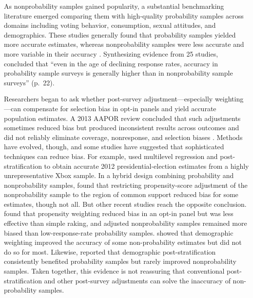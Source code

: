 \documentclass[12pt]{article}
\begin{document}
As nonprobability samples gained popularity, a substantial benchmarking literature emerged comparing them with high-quality probability samples across domains including voting behavior, consumption, sexual attitudes, and demographics. These studies generally found that probability samples yielded more accurate estimates, whereas nonprobability samples were less accurate and more variable in their accuracy \parencite[e.g.,][]{chang_national_2009, dutwin_apples_2017, erens_nonprobability_2014, macinnis_accuracy_2018, sturgis_assessment_2018, szolnoki_online_2013, yeager_comparing_2011}. Synthesizing evidence from 25 studies, \textcite{cornesse_review_2020} concluded that ``even in the age of declining response rates, accuracy in probability sample surveys is generally higher than in nonprobability sample surveys'' (p.~22).

Researchers began to ask whether post-survey adjustment—especially weighting—can compensate for selection bias in opt-in panels and yield accurate population estimates. A 2013 AAPOR review concluded that such adjustments sometimes reduced bias but produced inconsistent results across outcomes and did not reliably eliminate coverage, nonresponse, and selection biases \parencite{baker_report_2013}. Methods have evolved, though, and some studies have suggested that sophisticated techniques can reduce bias. For example, \textcite{wang_forecasting_2015} used multilevel regression and post-stratification to obtain accurate 2012 presidential-election estimates from a highly unrepresentative Xbox sample. In a hybrid design combining probability and nonprobability samples, \textcite{dever_combining_2018} found that restricting propensity-score adjustment of the nonprobability sample to the region of common support reduced bias for some estimates, though not all. But other recent studies reach the opposite conclusion. \textcite{dutwin_apples_2017} found that propensity weighting reduced bias in an opt-in panel but was less effective than simple raking, and adjusted nonprobability samples remained more biased than low-response-rate probability samples. \textcite{yeager_comparing_2011} showed that  demographic weighting improved the accuracy of some non-probability estimates but did not do so for most. Likewise, \textcite{macinnis_accuracy_2018} reported that demographic post-stratification consistently benefited probability samples but rarely improved nonprobability samples. Taken together, this evidence is not reassuring that conventional post-stratification and other post-survey adjustments can solve the inaccuracy of non-probability samples. 
\end{document}
